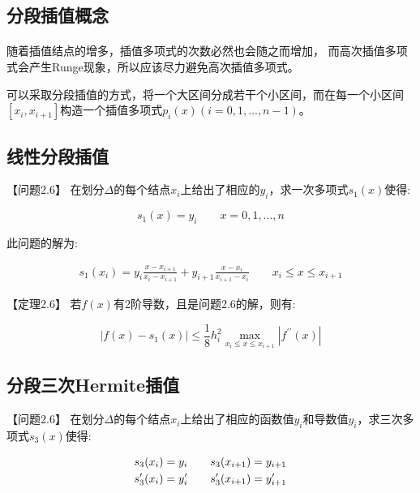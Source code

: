 \documentclass[12pt]{report}
\begin{document}
\subsection{分段插值概念}

\paragraph{ } 随着插值结点的增多，插值多项式的次数必然也会随之而增加，
而高次插值多项式会产生Runge现象，所以应该尽力避免高次插值多项式。

可以采取分段插值的方式，将一个大区间分成若干个小区间，而在每一个小区间
$[x_i,x_{i+1}]$构造一个插值多项式$p_i(x)(i=0,1,\ldots,n-1)$。 \\

\subsection{线性分段插值}

【问题2.6】 \quad 在划分$\Delta$的每个结点$x_i$上给出了相应的$y_i$，求一次多项式$s_1(x)$使得:

\[
	s_1 (x) = y_i \qquad x = 0, 1, \ldots , n
\]

此问题的解为:

\begin{equation}
	\begin{aligned}
		s_1(x_i) = y_i \frac{x - x_{i+1}}{x_i - x_{i+1}} + y_{i+1} \frac{x - x_i}{x_{i+1} - x_i} \quad \quad x_i \leq x \leq x_{i+1}
	\end{aligned}
	\tag{2.16} \label{2.16}
\end{equation}

【定理2.6】 \quad 若$f(x)$有2阶导数，且是问题2.6的解，则有:

\begin{equation}
	|f(x) - s_1 (x)| \leq \frac{1}{8} 
	h_i^2 \max_{x_i \leq x \leq x_{i+1}} |f^{\prime \prime}(x)| 
	\tag{2.17} \label{2.17}
\end{equation}


\subsection{分段三次Hermite插值}

【问题2.6】 \quad 在划分$\Delta$的每个结点$x_i$上给出了相应的函数值$y_i$和导数值$y_i$，求三次多项式$s_3(x)$使得:

\begin{equation}
	\begin{aligned}
		s_3(x_i) = y_i \qquad s_3(x_{i+1}) = y_{i+1} \\
		s'_3(x_i) = y'_i \qquad s'_3(x_{i+1}) = y'_{i+1}
	\end{aligned}
	\notag
\end{equation}
\end{document}

